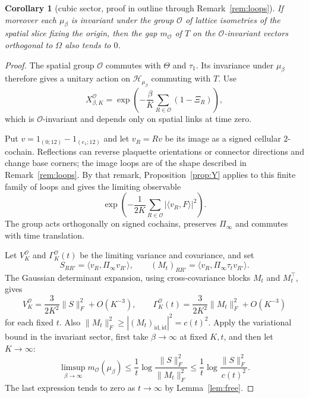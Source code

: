 \documentclass[11pt,a4paper]{article}
\theoremstyle{plain}
\newtheorem{corollary}[theorem]{Corollary}
\theoremstyle{definition}
\theoremstyle{remark}
\numberwithin{equation}{section}
\newcommand{\cH}{\mathcal{H}}
\newcommand{\cO}{\mathcal{O}}
\newcommand{\Th}{\Theta}
\begin{document}
\begin{corollary}[cubic sector, proof in outline through Remark~\ref{rem:loops}]\label{cor:cubic}
If moreover each $\mu_\beta$ is invariant under the group $\cO$ of lattice isometries of the spatial slice fixing the origin, then the gap
$m_\cO$ of $T$ on the $\cO$-invariant vectors orthogonal to $\Omega$ also tends to $0$.
\end{corollary}
\begin{proof}
The spatial group $\cO$ commutes with $\Th$ and $\tau_1$.
Its invariance under $\mu_\beta$ therefore gives a unitary action on $\cH_{\mu_\beta}$ commuting with $T$.
Use
\[
X^\cO_{\beta,K}
=\exp\!\left(-\frac\beta K\sum_{R\in\cO}(1-\Xi_R)\right),
\]
which is $\cO$-invariant and depends only on spatial links at time zero.

Put $v=1_{(0;12)}-1_{(e_1;12)}$ and let $v_R=Rv$ be its image as a signed cellular $2$-cochain.
Reflections can reverse plaquette orientations or connector directions and change base corners; the image loops are of the shape
described in Remark~\ref{rem:loops}.
By that remark, Proposition~\ref{prop:Y} applies to this finite family of loops and gives the limiting observable
\[
\exp\!\left(-\frac1{2K}\sum_{R\in\cO}|\langle v_R,F\rangle|^2\right).
\]
The group acts orthogonally on signed cochains, preserves $\Pi_\infty$ and commutes with time translation.

Let $V^\cO_K$ and $\Gamma^\cO_K(t)$ be the limiting variance and covariance, and set
\[
S_{RR'}=\langle v_R,\Pi_\infty v_{R'}\rangle,
\qquad
(M_t)_{RR'}=\langle v_R,\Pi_\infty\tau_t v_{R'}\rangle.
\]
The Gaussian determinant expansion, using cross-covariance blocks $M_t$ and $M_t^\top$, gives
\[
V^\cO_K=\frac3{2K^2}\|S\|_F^2+O(K^{-3}),
\qquad
\Gamma^\cO_K(t)=\frac3{2K^2}\|M_t\|_F^2+O(K^{-3})
\]
for each fixed $t$. Also $\|M_t\|_F^2\ge |(M_t)_{\mathrm{id},\mathrm{id}}|^2=c(t)^2$.
Apply the variational bound in the invariant sector, first take $\beta\to\infty$ at fixed $K,t$, and then let $K\to\infty$:
\[
\limsup_{\beta\to\infty}m_\cO(\mu_\beta)
\le\frac1t\log\frac{\|S\|_F^2}{\|M_t\|_F^2}
\le\frac1t\log\frac{\|S\|_F^2}{c(t)^2}.
\]
The last expression tends to zero as $t\to\infty$ by Lemma~\ref{lem:free}.
\end{proof}
\end{document}
